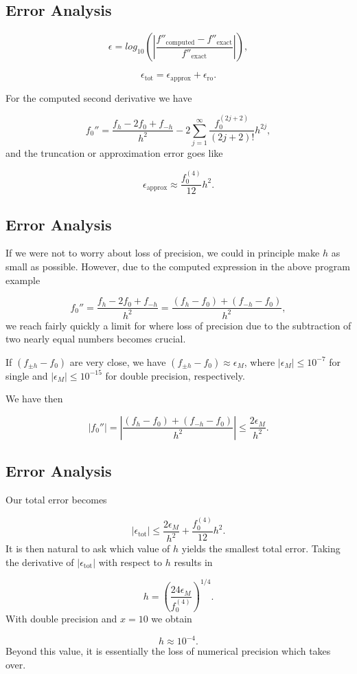 \documentclass[%
oneside,                 %
final,                   %
10pt]{article}
\begin{document}
\subsection{Error Analysis}

\begin{block}{}
\[
   \epsilon=log_{10}\left(\left|\frac{f''_{\mbox{computed}}-f''_{\mbox{exact}}}
                 {f''_{\mbox{exact}}}\right|\right),
\]

\[
   \epsilon_{\mbox{tot}}=\epsilon_{\mbox{approx}}+\epsilon_{\mbox{ro}}.
\]

For the computed second derivative  we have

\[
 f_0''=\frac{ f_h -2f_0 +f_{-h}}{h^2}-2\sum_{j=1}^{\infty}\frac{f_0^{(2j+2)}}{(2j+2)!}h^{2j},
\]
and the truncation or approximation error goes like

\[
  \epsilon_{\mbox{approx}}\approx \frac{f_0^{(4)}}{12}h^{2}.
\]
\end{block}

\subsection{Error Analysis}

\begin{block}{}
If we were not to worry about loss of precision, we could in principle
make $h$ as small as possible.
However, due to the computed expression in the above program example

\[
 f_0''=\frac{ f_h -2f_0 +f_{-h}}{h^2}=\frac{ (f_h -f_0) +(f_{-h}-f_0)}{h^2},
\]
we reach fairly quickly a limit for where loss of precision due to the subtraction
of two nearly equal numbers becomes crucial.

If $(f_{\pm h} -f_0)$ are very close, we have
$(f_{\pm h} -f_0)\approx \epsilon_M$, where $|\epsilon_M|\le 10^{-7}$ for single and
$|\epsilon_M|\le 10^{-15}$ for double precision, respectively.

We have then

\[
 \left|f_0''\right|=
 \left|\frac{ (f_h -f_0) +(f_{-h}-f_0)}{h^2}\right|\le \frac{ 2 \epsilon_M}{h^2}.
\]
\end{block}

\subsection{Error Analysis}

\begin{block}{}
Our total error becomes

\[
   \left|\epsilon_{\mbox{tot}}\right|\le  \frac{2 \epsilon_M}{h^2} +
                          \frac{f_0^{(4)}}{12}h^{2}.
    \label{eq:experror}
\]
It is then natural to ask which value of $h$ yields the smallest
total error. Taking the derivative of $\left|\epsilon_{\mbox{tot}}\right|$
with respect to $h$ results in

\[
   h= \left(\frac{ 24\epsilon_M}{f_0^{(4)}}\right)^{1/4}.
\]
With double precision and $x=10$ we obtain

\[
   h\approx 10^{-4}.
\]
Beyond this value, it is essentially the loss of numerical precision
which takes over.
\end{block}
\end{document}
